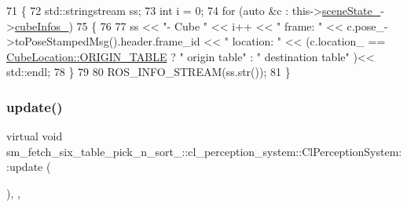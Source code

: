 \begin{DoxyCode}
71             \{
72                 std::stringstream ss;
73                 \textcolor{keywordtype}{int} i = 0;
74                 \textcolor{keywordflow}{for} (\textcolor{keyword}{auto} &c : this->\hyperlink{classsm__fetch__six__table__pick__n__sort__1_1_1cl__perception__system_1_1ClPerceptionSystem_abf68c35d49ab0c766521e23f4e3b4d41}{sceneState\_}->\hyperlink{classsm__fetch__six__table__pick__n__sort__1_1_1cl__perception__system_1_1CpSceneState_a9e412e0e18779e1fe371b0160919bd9b}{cubeInfos\_})
75                 \{
76 
77                     ss << \textcolor{stringliteral}{"- Cube "} << i++ << \textcolor{stringliteral}{" frame: "} << c.pose\_->toPoseStampedMsg().header.frame\_id << \textcolor{stringliteral}{
      " location: "} << (c.location\_ == \hyperlink{namespacesm__fetch__six__table__pick__n__sort__1_1_1cl__perception__system_a371363065945abbb60dad8b56601afa0ae5ee34c3ef8ec4a46a00a218416c7b1d}{CubeLocation::ORIGIN\_TABLE} ? \textcolor{stringliteral}{" origin table"} : \textcolor{stringliteral}{"
       destination table"} )<< std::endl;
78                 \}
79 
80                 ROS\_INFO\_STREAM(ss.str());
81             \}
\end{DoxyCode}
\mbox{\label{classsm__fetch__six__table__pick__n__sort__1_1_1cl__perception__system_1_1ClPerceptionSystem_a87292907b7b771d19d91c6de47ea8d1d}} 
\subsubsection{\texorpdfstring{update()}{update()}}
{\footnotesize\ttfamily virtual void sm\+\_\+fetch\+\_\+six\+\_\+table\+\_\+pick\+\_\+n\+\_\+sort\+\_\+::cl\+\_\+perception\+\_\+system\+::\+Cl\+Perception\+System\+::update (\begin{DoxyParamCaption}{ }\end{DoxyParamCaption})\hspace{0.3cm}{\ttfamily [inline]}, {\ttfamily [override]}, {\ttfamily [virtual]}}



